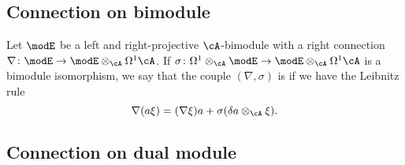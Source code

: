 \subsection{Connection on bimodule}

Let $\modE$ be a left and right-projective $\cA$-bimodule with a right connection $\nabla\colon \modE\to \modE\otimes_{\cA}\Omega^1\cA$. If $\sigma\colon \Omega^1\otimes_{\cA}\modE\to \modE\otimes_{\cA}\Omega^1\cA$ is a bimodule isomorphism, we say that the couple $(\nabla,\sigma)$ is  if we have the Leibnitz rule
\begin{equation}
	\nabla(a\xi)=(\nabla\xi)a+\sigma(\delta a\otimes_{\cA}\xi).
\end{equation}

\subsection{Connection on dual module}

